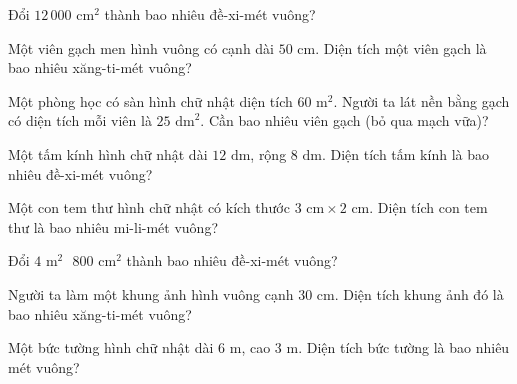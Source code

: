 \begin{ex}
  Đổi $12\,000\text{ cm}^2$ thành bao nhiêu đề-xi-mét vuông?
\end{ex}

\begin{ex}
  Một viên gạch men hình vuông có cạnh dài $50\text{ cm}$. Diện tích một viên gạch là bao nhiêu xăng-ti-mét vuông?
\end{ex}

\begin{ex}
  Một phòng học có sàn hình chữ nhật diện tích $60\text{ m}^2$. Người ta lát nền bằng gạch có diện tích mỗi viên là $25\text{ dm}^2$. Cần bao nhiêu viên gạch (bỏ qua mạch vữa)?
\end{ex}

\begin{ex}
  Một tấm kính hình chữ nhật dài $12\text{ dm}$, rộng $8\text{ dm}$. Diện tích tấm kính là bao nhiêu đề-xi-mét vuông?
\end{ex}

\begin{ex}
  Một con tem thư hình chữ nhật có kích thước $3\text{ cm} \times 2\text{ cm}$. Diện tích con tem thư là bao nhiêu mi-li-mét vuông?
\end{ex}

\begin{ex}
  Đổi $4\text{ m}^2\text{ } 800\text{ cm}^2$ thành bao nhiêu đề-xi-mét vuông?
\end{ex}

\begin{ex}
  Người ta làm một khung ảnh hình vuông cạnh $30\text{ cm}$. Diện tích khung ảnh đó là bao nhiêu xăng-ti-mét vuông?
\end{ex}

\begin{ex}
  Một bức tường hình chữ nhật dài $6\text{ m}$, cao $3\text{ m}$. Diện tích bức tường là bao nhiêu mét vuông?
\end{ex}

